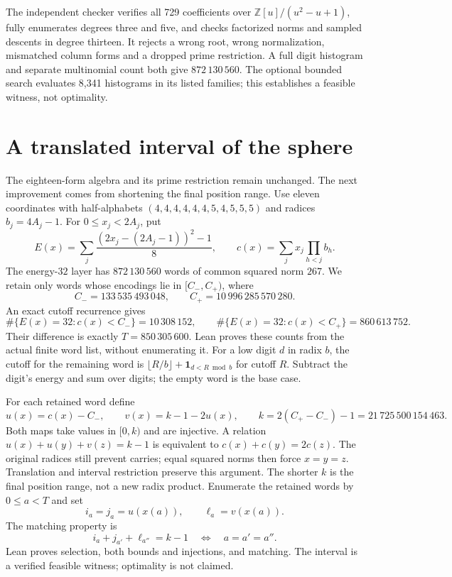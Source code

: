 \documentclass[11pt]{article}
\begin{document}
The independent checker verifies all 729 coefficients over
$\mathbb Z[u]/(u^2-u+1)$, fully enumerates degrees three and five,
and checks factorized norms and sampled descents in degree thirteen.
It rejects a wrong root, wrong normalization, mismatched column forms
and a dropped prime restriction. A full digit histogram and separate
multinomial count both give $872\,130\,560$.
The optional bounded search evaluates 8,341 histograms in its listed
families; this establishes a feasible witness, not optimality.

\section{A translated interval of the sphere}\label{sec:trimmed}
The eighteen-form algebra and its prime restriction remain unchanged.
The next improvement comes from shortening the final position range.
Use eleven coordinates with half-alphabets
$(4,4,4,4,4,4,5,4,5,5,5)$ and radices $b_j=4A_j-1$.
For $0\le x_j<2A_j$, put
\[
 E(x)=\sum_j\frac{(2x_j-(2A_j-1))^2-1}{8},\qquad
 c(x)=\sum_j x_j\prod_{h<j}b_h.
\]
The energy-$32$ layer has $872\,130\,560$ words of common squared
norm $267$. We retain only words whose encodings lie in $[C_-,C_+)$, where
\[
 C_-=133\,535\,493\,048,\qquad C_+=10\,996\,285\,570\,280.
\]
An exact cutoff recurrence gives
\[
 \#\{E(x)=32:c(x)<C_-\}=10\,308\,152,\qquad
 \#\{E(x)=32:c(x)<C_+\}=860\,613\,752.
\]
Their difference is exactly $T=850\,305\,600$. Lean proves these
counts from the actual finite word list, without enumerating it.
For a low digit $d$ in radix $b$, the cutoff for the remaining word is
$\lfloor R/b\rfloor+\mathbf1_{d<R\bmod b}$ for cutoff $R$. Subtract the digit's
energy and sum over digits; the empty word is the base case.

For each retained word define
\[
 u(x)=c(x)-C_-,\qquad v(x)=k-1-2u(x),\qquad
 k=2(C_+-C_-)-1=21\,725\,500\,154\,463.
\]
Both maps take values in $[0,k)$ and are injective. A relation
$u(x)+u(y)+v(z)=k-1$ is equivalent to $c(x)+c(y)=2c(z)$.
The original radices still prevent carries; equal squared norms then
force $x=y=z$. Translation and interval restriction preserve this
argument. The shorter $k$ is the final position range, not a new radix
product. Enumerate the retained words by $0\le a<T$ and set
\begin{equation}\label{trimmed:positions}
 i_a=j_a=u(x(a)),\qquad \ell_a=v(x(a)).
\end{equation}
The matching property is
\begin{equation}\label{trimmed:matching}
 i_a+j_{a'}+\ell_{a''}=k-1\quad\Longleftrightarrow\quad a=a'=a''.
\end{equation}
Lean proves selection, both bounds and injections, and matching.
The interval is a verified feasible witness; optimality is not claimed.
\end{document}
